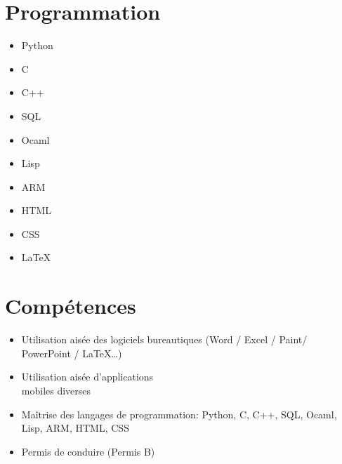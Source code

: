 \documentclass[9pt, oneside, a4paper, titlepage]{extarticle}
\begin{document}
\begin{tcolorbox}
\begin{minipage}[t]{6.2cm}
\begin{spacing}{0.95}
\begin{tcolorbox}[grow to left by = 0.6cm, colback = gray!25, colframe = white]
                \section*{Programmation}
                \vspace*{0.2cm}
                \begin{multicols}{2}
                    \begin{itemize}
                        \item Python
                        \item C
                        \item C++
                        \item SQL
                        \item Ocaml
                        \columnbreak                    
                        \item Lisp
                        \item ARM
                        \item HTML
                        \item CSS
                        \item \LaTeX
                    \end{itemize}
                    \end{multicols}
                    \vspace*{0.2cm}
                \section*{Compétences}

                \begin{itemize}
                    \vspace*{0.2cm}
                    \item Utilisation aisée des logiciels bureautiques (Word / Excel / Paint/ \\PowerPoint / \LaTeX \ldots)
                    \vspace*{0.2cm}
                    \item Utilisation aisée d’applications \\mobiles diverses
                    \vspace*{0.2cm}
                    \item Maîtrise des langages de programmation: Python, C, C++, SQL, Ocaml, Lisp, ARM, HTML, CSS
                    \item Permis de conduire (Permis B)
                \end{itemize}



\end{tcolorbox}
\end{spacing}
\end{minipage}
\end{tcolorbox}
\end{document}
